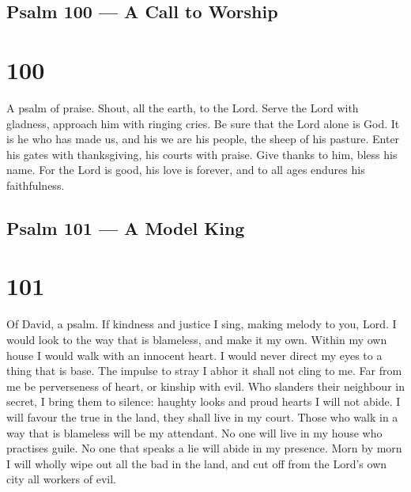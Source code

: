 \hypertarget{psalm-100-a-call-to-worship}{%
\subsection{Psalm 100 --- A Call to
Worship}\label{psalm-100-a-call-to-worship}}

\hypertarget{section-99}{%
\section{100}\label{section-99}}

A psalm of praise.  Shout, all the earth, to the Lord.
 Serve the Lord with gladness, approach him with ringing
cries.  Be sure that the Lord alone is God. It is he who has
made us, and his we are his people, the sheep of his pasture.
 Enter his gates with thanksgiving, his courts with praise.
Give thanks to him, bless his name.  For the Lord is good,
his love is forever, and to all ages endures his faithfulness.

\hypertarget{psalm-101-a-model-king}{%
\subsection{Psalm 101 --- A Model King}\label{psalm-101-a-model-king}}

\hypertarget{section-100}{%
\section{101}\label{section-100}}

Of David, a psalm.  If kindness and justice I sing, making
melody to you, Lord.  I would look to the way that is
blameless, and make it my own. Within my own house I would walk with an
innocent heart.  I would never direct my eyes to a thing
that is base. The impulse to stray I abhor it shall not cling to me.
 Far from me be perverseness of heart, or kinship with evil.
 Who slanders their neighbour in secret, I bring them to
silence: haughty looks and proud hearts I will not abide.  I
will favour the true in the land, they shall live in my court. Those who
walk in a way that is blameless will be my attendant.  No
one will live in my house who practises guile. No one that speaks a lie
will abide in my presence.  Morn by morn I will wholly wipe
out all the bad in the land, and cut off from the Lord's own city all
workers of evil.

